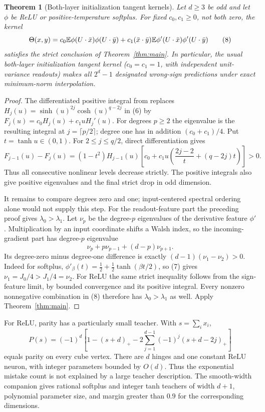 \documentclass[11pt]{article}
\newtheorem{theorem}{Theorem}\newtheorem{lemma}[theorem]{Lemma}
\begin{document}
\begin{theorem}[Both-layer initialization tangent kernels]
\label{thm:tangent}
Let $d\ge3$ be odd and let $\phi$ be ReLU or positive-temperature
softplus. For fixed $c_0,c_1\ge0$, not both zero, the kernel
\[
 \Theta(x,y)=c_0\mathbb E\phi(U\cdot\bar x)\phi(U\cdot\bar y)
       +c_1(\bar x\cdot\bar y)
              \mathbb E\phi'(U\cdot\bar x)\phi'(U\cdot\bar y)
                                                               \tag{8}
\]
satisfies the strict conclusion of Theorem~\ref{thm:main}.
In particular, the usual both-layer initialization tangent kernel
($c_0=c_1=1$, with independent unit-variance readouts) makes all
$2^d-1$ designated wrong-sign predictions under exact minimum-norm
interpolation.
\end{theorem}
\begin{proof}
The differentiated positive integral from \cite{smoothing} replaces
$H_j(u)=\sinh(u)^{2j}\cosh(u)^{q-2j}$ in (6) by
$F_j(u)=c_0H_j(u)+c_1uH_j'(u)$. For degrees $p\ge2$ the eigenvalue
is the resulting integral at $j=\lceil p/2\rceil$; degree one has
in addition $(c_0+c_1)/4$. Put $t=\tanh u\in(0,1)$.
For $2\le j\le q/2$, direct differentiation gives
\[
 F_{j-1}(u)-F_j(u)
 =(1-t^2)H_{j-1}(u)
 \left[c_0+c_1u\left(\frac{2j-2}{t}+(q-2j)t\right)\right]>0.
                                                               \tag{9}
\]
Thus all consecutive nonlinear levels decrease strictly. The positive
integrals also give positive eigenvalues and the final strict drop
in odd dimension.

It remains to compare degrees zero and one; input-centered spectral
ordering alone would not supply this step. For the readout-feature
part the preceding proof gives $\lambda_0>\lambda_1$. Let $\nu_p$
be the degree-$p$ eigenvalues of the derivative feature $\phi'$.
Multiplication by an input coordinate shifts a Walsh index, so the
incoming-gradient part has degree-$p$ eigenvalue
\[
           \nu_p+p\nu_{p-1}+(d-p)\nu_{p+1}.
\]
Its degree-zero minus degree-one difference is exactly
$(d-1)(\nu_1-\nu_2)>0$. Indeed for softplus,
$\phi'_\beta(t)=\tfrac12+\tfrac12\tanh(\beta t/2)$,
so (7) gives $\nu_1=J_0/4>J_1/4=\nu_2$.
For ReLU the same strict inequality follows from the sign-feature
limit, by bounded convergence and its positive integral. Every
nonzero nonnegative combination in (8) therefore has
$\lambda_0>\lambda_1$ as well. Apply Theorem~\ref{thm:main}.
\end{proof}

For ReLU, parity has a particularly small teacher. With
$s=\sum_i x_i$,
\[
 P(s)=(-1)^d\left[1-(s+d)_+
                  -2\sum_{j=1}^{d-1}(-1)^j(s+d-2j)_+\right]
                                                               \tag{10}
\]
equals parity on every cube vertex. There are $d$ hinges and one
constant ReLU neuron, with integer parameters bounded by $O(d)$.
Thus the exponential mistake count is not explained by a large
teacher description. The smooth-width companion gives rational
softplus and integer tanh teachers of width $d+1$, polynomial parameter
size, and margin greater than $0.9$ for the corresponding dimensions.
\end{document}
